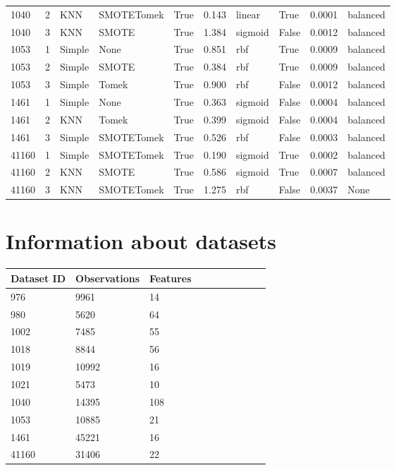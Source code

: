 \documentclass[11pt]{article}
\begin{document}
\begin{table}
\begin{tabular}{llllllllll}
1040 & 2 & KNN & SMOTETomek & True & 0.143 & linear & True & 0.0001 & balanced \\
1040 & 3 & KNN & SMOTE & True & 1.384 & sigmoid & False & 0.0012 & balanced \\
\midrule
1053 & 1 & Simple & None & True & 0.851 & rbf & True & 0.0009 & balanced \\
1053 & 2 & Simple & SMOTE & True & 0.384 & rbf & True & 0.0009 & balanced \\
1053 & 3 & Simple & Tomek & True & 0.900 & rbf & False & 0.0012 & balanced \\
\midrule
1461 & 1 & Simple & None & True & 0.363 & sigmoid & False & 0.0004 & balanced \\
1461 & 2 & KNN & Tomek & True & 0.399 & sigmoid & False & 0.0004 & balanced \\
1461 & 3 & Simple & SMOTETomek & True & 0.526 & rbf & False & 0.0003 & balanced \\
\midrule
41160 & 1 & Simple & SMOTETomek & True & 0.190 & sigmoid & True & 0.0002 & balanced \\
41160 & 2 & KNN & SMOTE & True & 0.586 & sigmoid & True & 0.0007 & balanced \\
41160 & 3 & KNN & SMOTETomek & True & 1.275 & rbf & False & 0.0037 & None \\
\bottomrule
\end{tabular}
\end{table}

\section{Information about datasets}

\center
\begin{tabular}{llllllllll}
\toprule
Dataset ID & Observations & Features \\
\midrule
976 & 9961 & 14 \\
980 & 5620 & 64 \\
1002 & 7485 & 55 \\
1018 & 8844 & 56 \\
1019 & 10992 & 16 \\
1021 & 5473 & 10 \\
1040 & 14395 & 108 \\
1053 & 10885 & 21 \\
1461 & 45221 & 16 \\
41160 & 31406 & 22 \\
\bottomrule
\end{tabular}

\end{document}
